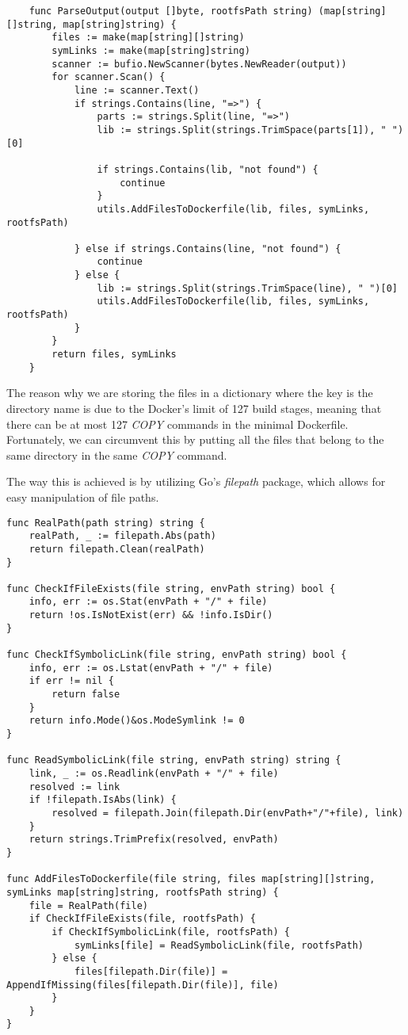 \lstset{language=Go,caption=ldd parser function,label=lst:ldd-parser}
\begin{lstlisting}
    func ParseOutput(output []byte, rootfsPath string) (map[string][]string, map[string]string) {
        files := make(map[string][]string)
        symLinks := make(map[string]string)
        scanner := bufio.NewScanner(bytes.NewReader(output))
        for scanner.Scan() {
            line := scanner.Text()
            if strings.Contains(line, "=>") {
                parts := strings.Split(line, "=>")
                lib := strings.Split(strings.TrimSpace(parts[1]), " ")[0]
    
                if strings.Contains(lib, "not found") {
                    continue
                }
                utils.AddFilesToDockerfile(lib, files, symLinks, rootfsPath)
    
            } else if strings.Contains(line, "not found") {
                continue
            } else {
                lib := strings.Split(strings.TrimSpace(line), " ")[0]
                utils.AddFilesToDockerfile(lib, files, symLinks, rootfsPath)
            }
        }
        return files, symLinks
    }
\end{lstlisting}

The reason why we are storing the files in a dictionary where the key is the directory name is due to 
the Docker's limit of 127 build stages, meaning that there can be at most 127 \textit{COPY} commands in the minimal Dockerfile.
Fortunately, we can circumvent this by putting all the files that belong to the same directory in the same \textit{COPY} command.

The way this is achieved is by utilizing Go's \textit{filepath} package, which allows for easy manipulation of file paths.

\lstset{language=Go,caption=File util functions,label=lst:file-functions}
\begin{lstlisting}
func RealPath(path string) string {
	realPath, _ := filepath.Abs(path)
	return filepath.Clean(realPath)
}

func CheckIfFileExists(file string, envPath string) bool {
	info, err := os.Stat(envPath + "/" + file)
	return !os.IsNotExist(err) && !info.IsDir()
}

func CheckIfSymbolicLink(file string, envPath string) bool {
	info, err := os.Lstat(envPath + "/" + file)
	if err != nil {
		return false
	}
	return info.Mode()&os.ModeSymlink != 0
}

func ReadSymbolicLink(file string, envPath string) string {
	link, _ := os.Readlink(envPath + "/" + file)
	resolved := link
	if !filepath.IsAbs(link) {
		resolved = filepath.Join(filepath.Dir(envPath+"/"+file), link)
	}
	return strings.TrimPrefix(resolved, envPath)
}

func AddFilesToDockerfile(file string, files map[string][]string, symLinks map[string]string, rootfsPath string) {
	file = RealPath(file)
	if CheckIfFileExists(file, rootfsPath) {
		if CheckIfSymbolicLink(file, rootfsPath) {
			symLinks[file] = ReadSymbolicLink(file, rootfsPath)
		} else {
			files[filepath.Dir(file)] = AppendIfMissing(files[filepath.Dir(file)], file)
		}
	}
}
\end{lstlisting}

